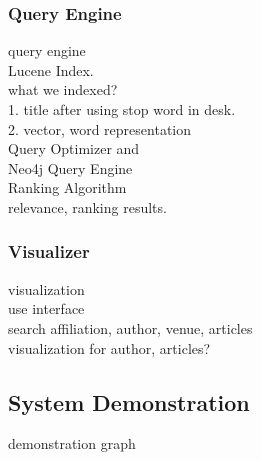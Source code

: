 \subsubsection{Query Engine}
query engine
\\Lucene Index.
\\ what we indexed?
\\ 1. title after using stop word in desk.
\\ 2. vector, word representation
\\ Query Optimizer  and
\\ Neo4j Query Engine
\\ Ranking Algorithm
\\ relevance, ranking results.

\subsubsection{Visualizer}
visualization
\\ use interface
\\ search affiliation, author, venue, articles
\\ visualization for author, articles?




\subsection{System Demonstration}

demonstration graph


